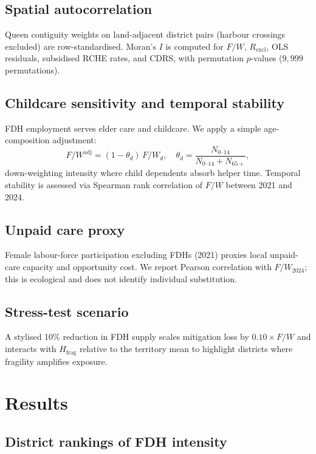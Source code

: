 \documentclass[11pt,a4paper]{article}
\begin{document}
\subsection{Spatial autocorrelation}

Queen contiguity weights on land-adjacent district pairs (harbour crossings excluded) are row-standardised. Moran's $I$ is computed for $F/W$, $R_{\mathrm{excl}}$, OLS residuals, subsidised RCHE rates, and CDRS, with permutation $p$-values ($9{,}999$ permutations).

\subsection{Childcare sensitivity and temporal stability}

FDH employment serves elder care and childcare. We apply a simple age-composition adjustment:
\begin{equation}
  F/W^{\mathrm{adj}} = (1-\theta_d)\, F/W_d, \quad \theta_d = \frac{N_{0\text{--}14}}{N_{0\text{--}14}+N_{65+}},
\end{equation}
down-weighting intensity where child dependents absorb helper time. Temporal stability is assessed via Spearman rank correlation of $F/W$ between 2021 and 2024.

\subsection{Unpaid care proxy}

Female labour-force participation excluding FDHs (2021) proxies local unpaid-care capacity and opportunity cost. We report Pearson correlation with $F/W_{2024}$; this is ecological and does not identify individual substitution.

\subsection{Stress-test scenario}

A stylised 10\% reduction in FDH supply scales mitigation loss by $0.10 \times F/W$ and interacts with $H_{\mathrm{frag}}$ relative to the territory mean to highlight districts where fragility amplifies exposure.

\section{Results}

\subsection{District rankings of FDH intensity}
\end{document}
